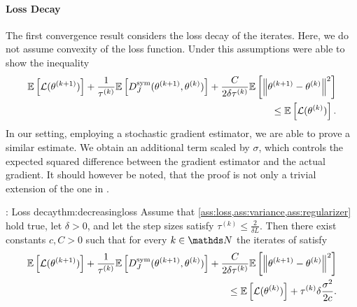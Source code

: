\paragraph{Loss Decay}
The first convergence result considers the loss decay of the iterates. Here, we do not assume convexity of the loss function. Under this assumptions \cite{benning2018choose, benning2018modern} were able to show the inequality
%
\begin{align*}
\begin{split}
\mathbb{E}\left[\mathcal{L}(\theta^{(k+1)})\right] + \frac{1}{\tau^{(k)}}\mathbb{E}\left[ D^\mathrm{sym}_J(\theta^{(k+1)},\theta^{(k)})\right] + \frac{C}{2\delta\tau^{(k)}}\mathbb{E}\left[\left\|\theta^{(k+1)}-\theta^{(k)}\right\|^2\right] \\
\leq \mathbb{E}\left[\mathcal{L}(\theta^{(k)})\right].
\end{split}
\end{align*}
%
%
In our setting, employing a stochastic gradient estimator, we are able to prove a similar estimate. We obtain an additional term scaled by $\sigma$, which controls the expected squared difference between the gradient estimator and the actual gradient. It should however be noted, that the proof is not only a trivial extension of the one in \cite{benning2018modern}.
%
%
\begin{theorem}{\cite[Th. 2]{bungert2022bregman}: Loss decay}{thm:decreasingloss}
Assume that \cref{ass:loss,ass:variance,ass:regularizer} hold true, let $\delta>0$, and let the step sizes satisfy $\tau^{(k)} \leq \frac{2}{\delta L}$.
Then there exist constants $c,C>0$ such that for every $k\in\N$ the iterates of  satisfy 
\begin{align}\label{ineq:loss_decay}
    \begin{split}
    \mathbb{E}\left[\mathcal{L}(\theta^{(k+1)})\right] + \frac{1}{\tau^{(k)}}\mathbb{E}\left[ D^\mathrm{sym}_J(\theta^{(k+1)},\theta^{(k)})\right] + \frac{C}{2\delta\tau^{(k)}}\mathbb{E}\left[\left\|\theta^{(k+1)}-\theta^{(k)}\right\|^2\right] \\
    \leq \mathbb{E}\left[\mathcal{L}(\theta^{(k)})\right] + \tau^{(k)}\delta\frac{\sigma^2}{2c}.
    \end{split}
\end{align}
\end{theorem}


